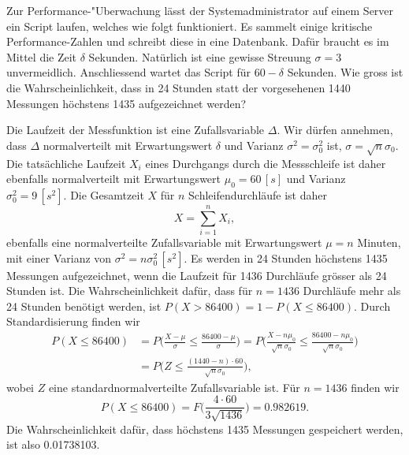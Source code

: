 Zur Performance-"Uberwachung lässt der Systemadministrator auf einem Server
ein Script laufen, welches wie folgt funktioniert. Es sammelt einige
kritische Performance-Zahlen und schreibt diese in eine Datenbank.
Dafür braucht es im Mittel die Zeit $\delta$ Sekunden. Natürlich
ist eine gewisse Streuung $\sigma=3$ unvermeidlich.
Anschliessend wartet das Script für $60-\delta$ Sekunden.
Wie gross ist die Wahrscheinlichkeit, dass in 24 Stunden statt
der vorgesehenen 1440 Messungen höchstens 1435 aufgezeichnet werden?


\begin{loesung}
Die Laufzeit der Messfunktion ist eine Zufallsvariable $\Delta$.
Wir dürfen annehmen, dass $\Delta$ normalverteilt mit Erwartungswert
$\delta$ und Varianz $\sigma^2=\sigma_0^2$ ist, $\sigma=\sqrt{n}\sigma_0$.
Die tatsächliche Laufzeit $X_i$ eines
Durchgangs durch die Messschleife ist daher ebenfalls normalverteilt
mit Erwartungswert $\mu_0=60\,[s]$ und Varianz $\sigma_0^2=9\,[s^2]$.
Die Gesamtzeit $X$ für
$n$ Schleifendurchläufe ist daher
\[
X=\sum_{i=1}^nX_i,
\]
ebenfalls eine normalverteilte Zufallsvariable
mit Erwartungswert $\mu = n$ Minuten,
mit einer Varianz von $\sigma^2=n\sigma_0^2\,[s^2]$.
Es werden in 24 Stunden höchstens 1435 Messungen aufgezeichnet,
wenn die Laufzeit für
1436 Durchläufe grösser als 24 Stunden ist. Die Wahrscheinlichkeit dafür,
dass für $n=1436$ Durchläufe mehr als 24 Stunden benötigt werden, 
ist $P(X > 86400) = 1-P(X\le 86400)$.
Durch Standardisierung finden wir
\begin{align*}
P(X\le 86400)
&=
P\biggl(
\frac{X-\mu}{\sigma}
\le
\frac{86400-\mu}{\sigma}
\biggr)
=
P\biggl(
\frac{X-n\mu_0}{\sqrt{n}\sigma_0}
\le
\frac{86400-n\mu_0}{\sqrt{n}\sigma_0}
\biggr)
\\
&=
P\biggl(
Z\le\frac{(1440-n)\cdot 60}{\sqrt{n}\sigma_0}
\biggr),
\end{align*}
wobei $Z$ eine standardnormalverteilte Zufallsvariable ist. Für $n=1436$
finden wir
\[
P(X\le 86400)=F\biggl(
\frac{4\cdot 60}{3\sqrt{1436}}
\biggr)=0.982619.
\]
Die Wahrscheinlichkeit dafür, dass höchstens 1435 Messungen gespeichert
werden, ist also 0.01738103.
\end{loesung}
